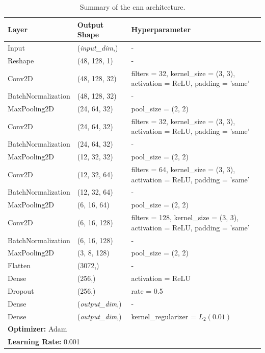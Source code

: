 \begin{table}[!htb]
  \centering
  \caption{Summary of the \gls{cnn} architecture.}
  \begin{tabular}{lll}
    \toprule
    \textbf{Layer} & \textbf{Output Shape} & \textbf{Hyperparameter} \\ \midrule
    Input & (\textit{input\_dim},) & - \\
    Reshape & (48, 128, 1) & - \\
    Conv2D & (48, 128, 32) & filters = 32, kernel\_size = (3, 3), activation = ReLU, padding = 'same' \\
    BatchNormalization & (48, 128, 32) & - \\
    MaxPooling2D & (24, 64, 32) & pool\_size = (2, 2) \\ \midrule

    Conv2D & (24, 64, 32) & filters = 32, kernel\_size = (3, 3), activation = ReLU, padding = 'same' \\
    BatchNormalization & (24, 64, 32) & - \\
    MaxPooling2D & (12, 32, 32) & pool\_size = (2, 2) \\ \midrule

    Conv2D & (12, 32, 64) & filters = 64, kernel\_size = (3, 3), activation = ReLU, padding = 'same' \\
    BatchNormalization & (12, 32, 64) & - \\
    MaxPooling2D & (6, 16, 64) & pool\_size = (2, 2) \\ \midrule

    Conv2D & (6, 16, 128) & filters = 128, kernel\_size = (3, 3), activation = ReLU, padding = 'same' \\
    BatchNormalization & (6, 16, 128) & - \\
    MaxPooling2D & (3, 8, 128) & pool\_size = (2, 2) \\ \midrule

    Flatten & (3072,) & - \\
    Dense & (256,) & activation = ReLU \\
    Dropout & (256,) & rate = 0.5 \\
    Dense & (\textit{output\_dim},) & - \\
    Dense & (\textit{output\_dim},) & kernel\_regularizer = $L_2(0.01)$ \\ \midrule
    \multicolumn{3}{l}{\textbf{Optimizer:} Adam} \\
    \multicolumn{3}{l}{\textbf{Learning Rate:} 0.001} \\
    \bottomrule
  \end{tabular}
  \label{tab:cnn_architecture}
\end{table}

